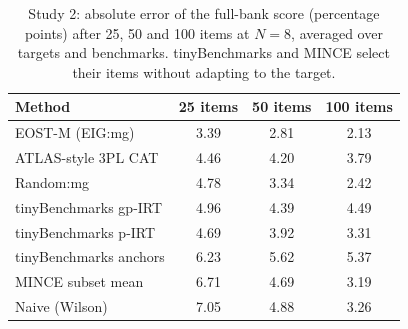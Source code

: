 \begin{table}[tbp]
\centering\footnotesize
\caption{Study 2: absolute error of the full-bank score (percentage points) after 25, 50 and 100 items at $N=8$, averaged over targets and benchmarks. tinyBenchmarks and MINCE select their items without adapting to the target.}
\label{tab:reduction}
\begin{tabular}{@{}lccc@{}}
\toprule
Method & 25 items & 50 items & 100 items \\
\midrule
EOST-M (EIG:mg) & 3.39 & 2.81 & 2.13 \\
ATLAS-style 3PL CAT & 4.46 & 4.20 & 3.79 \\
Random:mg & 4.78 & 3.34 & 2.42 \\
tinyBenchmarks gp-IRT & 4.96 & 4.39 & 4.49 \\
tinyBenchmarks p-IRT & 4.69 & 3.92 & 3.31 \\
tinyBenchmarks anchors & 6.23 & 5.62 & 5.37 \\
MINCE subset mean & 6.71 & 4.69 & 3.19 \\
Naive (Wilson) & 7.05 & 4.88 & 3.26 \\
\bottomrule
\end{tabular}
\end{table}
